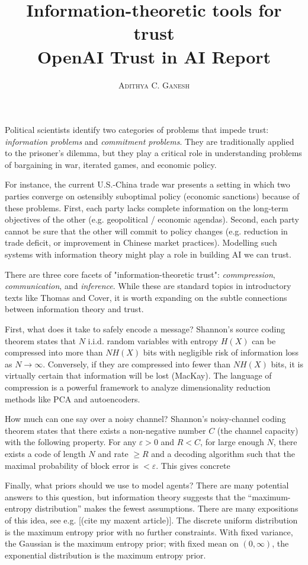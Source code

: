 \documentclass[11pt]{article}
\title{Information-theoretic tools for trust \\ \vspace{0.3cm} OpenAI Trust in AI Report}
\author{\textsc{Adithya C. Ganesh}}
\begin{document}
\noindent Political scientists identify two categories of problems that impede trust: {\it information problems} and {\it commitment problems}.  They are traditionally applied to the prisoner's dilemma, but they play a critical role in understanding problems of bargaining in war, iterated games, and economic policy.  

For instance, the current U.S.-China trade war presents a setting in which two parties converge on ostensibly suboptimal policy (economic sanctions) because of these problems.  First, each party lacks complete information on the long-term objectives of the other (e.g. geopolitical / economic agendas).  Second, each party cannot be sure that the other will commit to policy changes (e.g. reduction in trade deficit, or improvement in Chinese market practices).  Modelling such systems with information theory might play a role in building AI we can trust.

There are three core facets of "information-theoretic trust": {\it commpression}, {\it communication}, and {\it inference}.  While these are standard topics in introductory texts like Thomas and Cover, it is worth expanding on the subtle connections between information theory and trust.

First, what does it take to safely encode a message?  Shannon's source coding theorem states that $N$ i.i.d. random variables with entropy $H(X)$ can be compressed into more than $N H(X)$ bits with negligible risk of information loss as $N \to \infty$.  Conversely, if they are compressed into fewer than $N H(X)$ bits, it is virtually certain that information will be lost (MacKay).  The language of compression is a powerful framework to analyze dimensionality reduction methods like PCA and autoencoders.

How much can one say over a noisy channel?  Shannon's noisy-channel coding theorem states that there exists a non-negative number $C$ (the channel capacity) with the following property.  For any $\varepsilon > 0$ and $R < C$, for large enough $N$, there exists a code of length $N$ and rate $\geq R$ and a decoding algorithm such that the maximal probability of block error is $< \varepsilon$.  This gives concrete 

Finally, what priors should we use to model agents?  There are many potential answers to this question, but information theory suggests that the ``maximum-entropy distribution'' makes the fewest assumptions.  There are many expositions of this idea, see e.g. [(cite my maxent article)].  The discrete uniform distribution is the maximum entropy prior with no further constraints.  With fixed variance, the Gaussian is the maximum entropy prior; with fixed mean on $(0, \infty)$, the exponential distribution is the maximum entropy prior.
\end{document}
